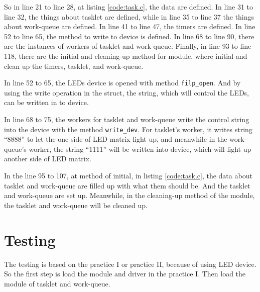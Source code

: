 \documentclass{report}
\begin{document}
    So in line 21 to line 28, at listing \ref{code:task.c}, the data are defined.
    In line 31 to line 32, the things about tasklet are defined,
    while in line 35 to line 37 the things about work-queue are defined.
    In line 41 to line 47, the timers are defined.
    In line 52 to line 65, the method to write to device is defined.
    In line 68 to line 90, there are the instances of workers of tasklet and work-queue.
    Finally, in line 93 to line 118, there are the initial and cleaning-up method
    for module, where initial and clean up the timers, tasklet, and work-queue.
    
    In line 52 to 65, the LEDs device is opened with method \lstinline|filp_open|.
    And by using the write operation in the struct, the string, which will control
    the LEDs, can be written in to device.
    
    In line 68 to 75, the workers for tasklet and work-queue write the control string
    into the device with the method \lstinline|write_dev|. For tasklet's worker,
    it writes string ``8888'' to let the one side of LED matrix light up,
    and meanwhile in the work-queue's worker, the string ``1111'' will be written into
    device, which will light up another side of LED matrix.
    
    In the line 95 to 107, at method of initial, in listing \ref{code:task.c},
    the data about tasklet and work-queue are filled up with what them should be.
    And the tasklet and work-queue are set up.
    Meanwhile, in the cleaning-up method of the module, the tasklet and work-queue will be cleaned up.

    \section{Testing}
    \label{sec:test}

    The testing is based on the practice I or practice II, because of using LED device.
    So the first step is load the module and driver in the practice I. Then load the 
    module of tasklet and work-queue.

    
    
\end{document}
